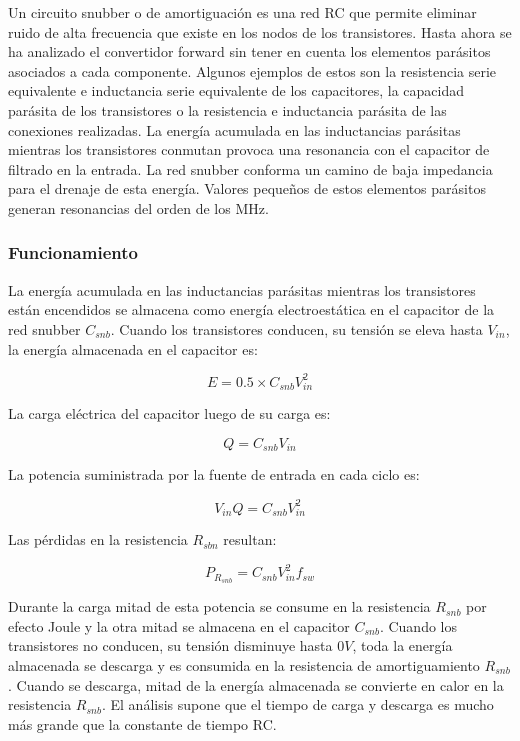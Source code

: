 Un circuito snubber o de amortiguación es una red RC que permite eliminar ruido de alta frecuencia que existe en los nodos de los transistores.
Hasta ahora se ha analizado el convertidor forward sin tener en cuenta los elementos parásitos asociados a cada componente. 
Algunos ejemplos de estos son la resistencia serie equivalente e inductancia serie equivalente de los capacitores, 
la capacidad parásita de los transistores o la resistencia e inductancia parásita de las conexiones realizadas. 
La energía acumulada en las inductancias parásitas mientras los transistores conmutan provoca una resonancia con el capacitor de filtrado en la entrada. 
La red snubber conforma un camino de baja impedancia para el drenaje de esta energía. 
Valores pequeños de estos elementos parásitos generan resonancias del orden de los MHz. 

\subsubsection{Funcionamiento}

La energía acumulada en las inductancias parásitas mientras los transistores están encendidos se almacena como energía electroestática en el capacitor de la red snubber $C_{snb}$. 
Cuando los transistores conducen, su tensión se eleva hasta $V_{in}$, la energía almacenada en el capacitor es: 

$$ E=0.5\times C_{snb}V_{in}^{2} $$

La carga eléctrica del capacitor luego de su carga es:

$$ Q=C_{snb}V_{in} $$

La potencia suministrada por la fuente de entrada en cada ciclo es:

$$ V_{in}Q=C_{snb}V_{in}^{2} $$

Las pérdidas en la resistencia $R_{sbn}$ resultan:

$$ P_{R_{snb}}=C_{snb}V_{in}^{2}f_{sw} $$

Durante la carga mitad de esta potencia se consume en la resistencia $R_{snb}$ por efecto Joule y la otra mitad se almacena en el capacitor $C_{snb}$. 
Cuando los transistores no conducen, su tensión disminuye hasta $0V$, toda la energía almacenada se descarga y es consumida en la resistencia de amortiguamiento $R_{snb}$.
Cuando se descarga, mitad de la energía almacenada se convierte en calor en la resistencia $R_{snb}$. 
El análisis supone que el tiempo de carga y descarga es mucho más grande que la constante de tiempo RC. 

